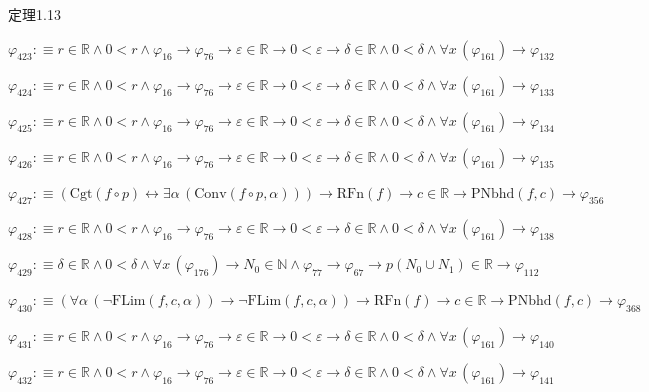 \begin{fullproof}{定理1.13}
\begin{abbrevlist}
\item $\varphi_{423} :\equiv r \in \mathbb{R} \land 0 < r \land \varphi_{16} \to \varphi_{76} \to \varepsilon \in \mathbb{R} \to 0 < \varepsilon \to \delta \in \mathbb{R} \land 0 < \delta \land \forall x\,(\varphi_{161}) \to \varphi_{132}$
\item $\varphi_{424} :\equiv r \in \mathbb{R} \land 0 < r \land \varphi_{16} \to \varphi_{76} \to \varepsilon \in \mathbb{R} \to 0 < \varepsilon \to \delta \in \mathbb{R} \land 0 < \delta \land \forall x\,(\varphi_{161}) \to \varphi_{133}$
\item $\varphi_{425} :\equiv r \in \mathbb{R} \land 0 < r \land \varphi_{16} \to \varphi_{76} \to \varepsilon \in \mathbb{R} \to 0 < \varepsilon \to \delta \in \mathbb{R} \land 0 < \delta \land \forall x\,(\varphi_{161}) \to \varphi_{134}$
\item $\varphi_{426} :\equiv r \in \mathbb{R} \land 0 < r \land \varphi_{16} \to \varphi_{76} \to \varepsilon \in \mathbb{R} \to 0 < \varepsilon \to \delta \in \mathbb{R} \land 0 < \delta \land \forall x\,(\varphi_{161}) \to \varphi_{135}$
\item $\varphi_{427} :\equiv (\mathrm{Cgt}(f \circ p) \leftrightarrow \exists \alpha\,(\mathrm{Conv}(f \circ p,\alpha))) \to \mathrm{RFn}(f) \to c \in \mathbb{R} \to \mathrm{PNbhd}(f,c) \to \varphi_{356}$
\item $\varphi_{428} :\equiv r \in \mathbb{R} \land 0 < r \land \varphi_{16} \to \varphi_{76} \to \varepsilon \in \mathbb{R} \to 0 < \varepsilon \to \delta \in \mathbb{R} \land 0 < \delta \land \forall x\,(\varphi_{161}) \to \varphi_{138}$
\item $\varphi_{429} :\equiv \delta \in \mathbb{R} \land 0 < \delta \land \forall x\,(\varphi_{176}) \to N_{0} \in \mathbb{N} \land \varphi_{77} \to \varphi_{67} \to p(N_{0} \cup N_{1}) \in \mathbb{R} \to \varphi_{112}$
\item $\varphi_{430} :\equiv (\forall \alpha\,(\neg \mathrm{FLim}(f,c,\alpha)) \to \neg \mathrm{FLim}(f,c,\alpha)) \to \mathrm{RFn}(f) \to c \in \mathbb{R} \to \mathrm{PNbhd}(f,c) \to \varphi_{368}$
\item $\varphi_{431} :\equiv r \in \mathbb{R} \land 0 < r \land \varphi_{16} \to \varphi_{76} \to \varepsilon \in \mathbb{R} \to 0 < \varepsilon \to \delta \in \mathbb{R} \land 0 < \delta \land \forall x\,(\varphi_{161}) \to \varphi_{140}$
\item $\varphi_{432} :\equiv r \in \mathbb{R} \land 0 < r \land \varphi_{16} \to \varphi_{76} \to \varepsilon \in \mathbb{R} \to 0 < \varepsilon \to \delta \in \mathbb{R} \land 0 < \delta \land \forall x\,(\varphi_{161}) \to \varphi_{141}$

\end{abbrevlist}
\end{fullproof}
